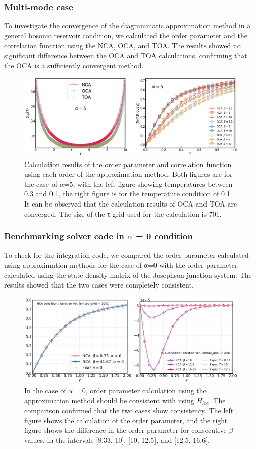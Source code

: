\documentclass{article}[12pt]
\begin{document}
\begin{spacing}{1.5}
\subsubsection*{Multi-mode case}
To investigate the convergence of the diagrammatic approximation method in a general bosonic reservoir condition, 
we calculated the order parameter and the correlation function using the NCA, OCA, and TOA. 
The results showed no significant difference between the OCA and TOA calculations, confirming that the OCA is a sufficiently convergent method.
\begin{figure}[H]
  \centerline{\includegraphics[width=15cm]{TexFigure/Multi_bench.png}}
  \caption{ Calculation results of the order parameter and correlation function using each order of the approximation method. 
  Both figures are for the case of $\alpha$=5, with the left figure showing temperatures between 0.3 and 0.1, 
  the right figure is for the temperature condition of 0.1. It can be observed that the calculation results of OCA and TOA are converged. 
  The size of the τ grid used for the calculation is 701.}
\end{figure}
\subsubsection*{Benchmarking solver code in $\alpha$ = 0 condition}
To check for the integration code, we compared the order parameter calculated using approximation methods for the case of α=0 
with the order parameter calculated using the state density matrix of the Josephson junction system. 
The results showed that the two cases were completely consistent.
\begin{figure}[H]
  \centerline{\includegraphics[width=15cm]{TexFigure/Dens_comp.png}}
  \caption{In the case of $\alpha = 0$, order parameter calculation using the approximation method should be consistent with using $H_{loc}$.
  The comparison confirmed that the two cases show consistency. The left figure shows the calculation of the order parameter, 
  and the right figure shows the difference in the order parameter for consecutive $\beta$ values,
   in the intervals [8.33, 10], [10, 12.5], and [12.5, 16.6].}
\end{figure}
\pagebreak

\end{spacing}
\end{document}
